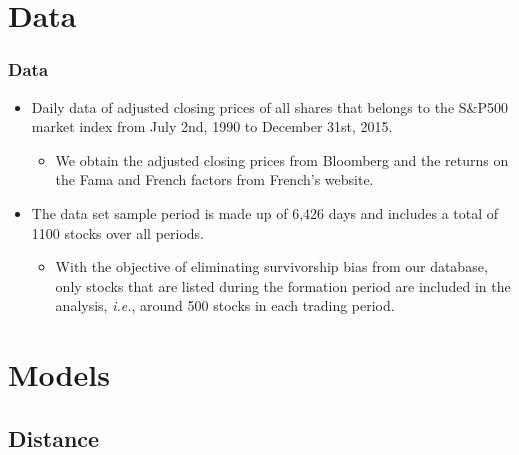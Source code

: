 \documentclass[pdf,9pt,xcolor=dvipsnames,hide notes]{beamer}
\begin{document}
	\section{Data}	

\begin{frame}[label=frame2b]
	\frametitle{Data}
		\begin{itemize}
		\justifying
		
		\item 	Daily data of adjusted closing prices of all shares that belongs to the S\&P500 market index from July 2nd, 1990 to December 31st, 2015. 
		\begin{itemize}
			\item We obtain the adjusted closing prices from Bloomberg and the returns on the Fama and French factors from French's website. 
		\end{itemize}
		
		\vspace{0.3cm}
		
		\item The data set sample period is made up of 6,426 days and includes a total of 1100 stocks over all periods. 
		\begin{itemize}
			\item With the objective of eliminating survivorship bias from our database, only stocks that are listed during the formation period are included in the analysis, \emph{i.e.}, around 500 stocks in each trading period.
		\end{itemize}
		
	\end{itemize}
	
\end{frame}

	\section{Models}
\subsection{Distance}
\end{document}
